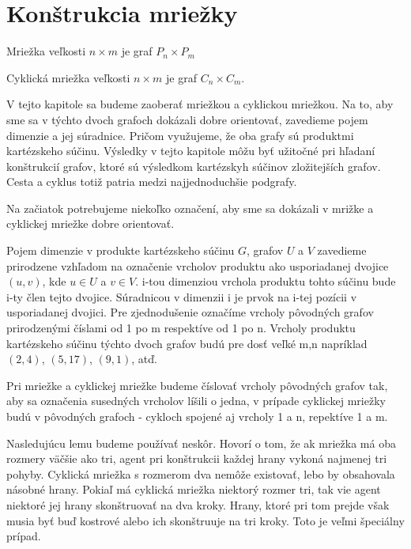 \chapter{Konštrukcia mriežky}
\begin{defin}
Mriežka veľkosti $ n \times m$ je graf $P_{n} \times P_{m}$
\end{defin}
\begin{defin}
Cyklická mriežka veľkosti $n \times m$ je graf $C_{n} \times C_{m}$.
\end{defin}

V tejto kapitole sa budeme zaoberať mriežkou a cyklickou mriežkou. Na to, aby sme sa v
týchto dvoch grafoch dokázali dobre orientovať, zavedieme pojem dimenzie a
jej súradnice. Pričom využujeme, že oba grafy sú produktmi kartézskeho
súčinu. Výsledky v tejto kapitole môžu byť užitočné pri hľadaní konštrukcií
grafov, ktoré sú výsledkom kartézskyh súčinov zložitejších grafov. Cesta a
cyklus totiž patria medzi najjednoduchšie podgrafy.

Na začiatok potrebujeme niekoľko označení, aby sme sa dokázali v mrižke a
cyklickej mriežke dobre orientovať.

\begin{ozn}
Pojem dimenzie v produkte kartézskeho súčinu $G$, grafov $U$ a $V$ 
zavedieme prirodzene vzhľadom
na označenie vrcholov produktu ako usporiadanej dvojice $(u,v)$, kde $u \in
U$ a $v \in V$. i-tou dimenziou vrchola produktu tohto súčinu bude i-ty člen
tejto dvojice. Súradnicou v dimenzii i je prvok na i-tej pozícii v
usporiadanej dvojici. Pre zjednodušenie označíme vrcholy pôvodných grafov
prirodzenými číslami od 1 po m respektíve od 1 po n. Vrcholy produktu
kartézskeho súčinu týchto dvoch grafov budú pre dosť veľké m,n napríklad
$(2,4)$, $(5,17)$, $(9,1)$, atď.
\end{ozn}

\begin{pozn}
Pri mriežke a cyklickej mriežke budeme číslovať vrcholy pôvodných grafov
tak, aby sa označenia susedných vrcholov líšili o jedna, v prípade cyklickej
mriežky budú v pôvodných grafoch - cykloch spojené aj vrcholy 1 a n,
repektíve 1 a m.
\end{pozn}

Nasledujúcu lemu budeme používať neskôr. Hovorí o tom, že ak mriežka má oba
rozmery väčšie ako tri, agent pri konštrukcii každej hrany vykoná najmenej
tri pohyby. Cyklická mriežka s rozmerom dva nemôže existovať, lebo by
obsahovala násobné hrany. Pokiaľ má cyklická mriežka niektorý rozmer tri,
tak vie agent niektoré jej hrany skonštruovať na dva kroky. Hrany, 
ktoré pri tom
prejde však musia byť buď kostrové alebo ich skonštruuje na tri kroky. Toto
je veľmi špeciálny prípad.

